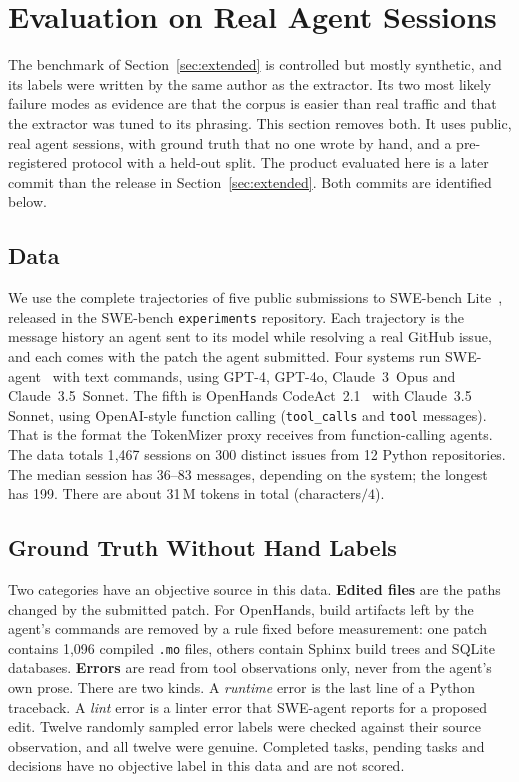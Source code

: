 \documentclass[journal]{IEEEtran}
\begin{document}
\section{Evaluation on Real Agent Sessions}
\label{sec:real}

The benchmark of Section~\ref{sec:extended} is controlled but
mostly synthetic, and its labels were written by the same author
as the extractor. Its two most likely failure modes as evidence
are that the corpus is easier than real traffic and that the
extractor was tuned to its phrasing. This section removes both.
It uses public, real agent sessions, with ground truth that no
one wrote by hand, and a pre-registered protocol with a
held-out split. The product evaluated here is a later commit
than the release in Section~\ref{sec:extended}. Both commits
are identified below.

\subsection{Data}
\label{sec:real-data}

We use the complete trajectories of five public submissions to
SWE-bench Lite~\cite{swebench}, released in the SWE-bench
\texttt{experiments} repository. Each trajectory is the message
history an agent sent to its model while resolving a real GitHub
issue, and each comes with the patch the agent submitted.
Four systems run SWE-agent~\cite{sweagent} with text commands,
using GPT-4, GPT-4o, Claude~3~Opus and Claude~3.5~Sonnet. The
fifth is OpenHands CodeAct~2.1~\cite{openhands} with Claude~3.5
Sonnet, using OpenAI-style function calling (\texttt{tool\_calls}
and \texttt{tool} messages). That is the format the TokenMizer
proxy receives from function-calling agents.
The data totals 1{,}467 sessions on 300 distinct issues from
12 Python repositories. The median session has 36--83 messages,
depending on the system; the longest has 199. There are about
31\,M tokens in total (characters$/4$).

\subsection{Ground Truth Without Hand Labels}
\label{sec:real-gt}

Two categories have an objective source in this data.
\textbf{Edited files} are the paths changed by the submitted
patch. For OpenHands, build artifacts left by the agent's
commands are removed by a rule fixed before measurement: one
patch contains 1{,}096 compiled \texttt{.mo} files, others
contain Sphinx build trees and SQLite databases.
\textbf{Errors} are read from tool observations only, never from
the agent's own prose. There are two kinds. A \emph{runtime}
error is the last line of a Python traceback. A \emph{lint}
error is a linter error that SWE-agent reports for a proposed
edit. Twelve randomly sampled error labels were checked against
their source observation, and all twelve were genuine.
Completed tasks, pending tasks and decisions have no objective
label in this data and are not scored.
\end{document}
